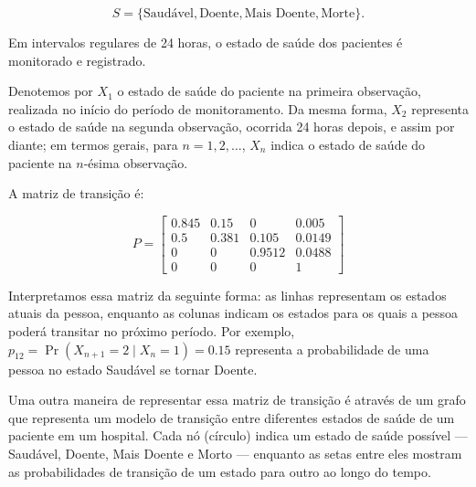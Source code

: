 \documentclass[12pt, a4paper, openany]{book}
\numberwithin{equation}{chapter}
\numberwithin{table}{chapter}
\numberwithin{figure}{chapter}
\theoremstyle{break}
\begin{document}
\[
S = \{ \text{Saudável}, \text{Doente}, \text{Mais Doente}, \text{Morte} \}.
\]

Em intervalos regulares de 24 horas, o estado de saúde dos pacientes é monitorado e registrado.

Denotemos por \( X_1 \) o estado de saúde do paciente na primeira observação, realizada no início do período de monitoramento. Da mesma forma, \( X_2 \) representa o estado de saúde na segunda observação, ocorrida 24 horas depois, e assim por diante; em termos gerais, para \( n = 1, 2, \dots \), \( X_n \) indica o estado de saúde do paciente na \( n \)-ésima observação.


A matriz de transição é:

\[
P = 
\begin{bmatrix}
0.845 & 0.15  & 0     & 0.005 \\ 
0.5   & 0.381 & 0.105 & 0.0149 \\
0     & 0     & 0.9512 & 0.0488 \\
0     & 0     & 0     & 1
\end{bmatrix}
\]


Interpretamos essa matriz da seguinte forma: as linhas representam os estados atuais da pessoa, enquanto as colunas indicam os estados para os quais a pessoa poderá transitar no próximo período. Por exemplo, \( p_{12} = \Pr(X_{n+1} = 2 \mid X_n = 1) =  0.15 \) representa a probabilidade de uma pessoa no estado Saudável se tornar Doente.




Uma outra maneira de representar essa matriz de transição é através de um  grafo que representa um modelo de transição entre diferentes estados de saúde de um paciente em um hospital. Cada nó (círculo) indica um estado de saúde possível — Saudável, Doente, Mais Doente e Morto — enquanto as setas entre eles mostram as probabilidades de transição de um estado para outro ao longo do tempo. 
\end{document}

